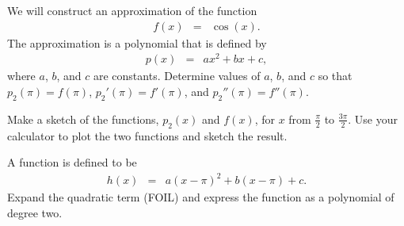 \begin{problem}
\item We will construct an approximation of the function
  \begin{eqnarray*}
    f(x) & = & \cos(x).
  \end{eqnarray*}
  The approximation is a polynomial that is defined by
  \begin{eqnarray*}
    p(x) & = & a x^2 + b x + c,
  \end{eqnarray*}
  where $a$, $b$, and $c$ are constants.
  Determine values of $a$, $b$, and $c$ so that $p_2(\pi)=f(\pi)$,
  $p_2'(\pi)=f'(\pi)$, and $p_2''(\pi)=f''(\pi)$.
  \vfill

  \clearpage

\item Make a sketch of the functions, $p_2(x)$ and $f(x)$, for $x$ from $\frac{\pi}{2}$ to
  $\frac{3\pi}{2}$. Use your calculator to plot the two functions and
  sketch the result.

  \vfill

\item A function is defined to be
  \begin{eqnarray*}
    h(x) & = & a (x-\pi)^2 + b (x-\pi) + c.
  \end{eqnarray*}
  Expand the quadratic term (FOIL) and express the function as a
  polynomial of degree two.

  \vspace{5em}


\end{problem}



